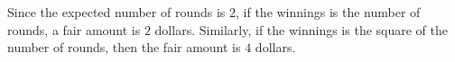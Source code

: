 Since the expected number of rounds is $2$, if the winnings is the
number of rounds, a fair amount is $2$ dollars. Similarly, if the
winnings is the square of the number of rounds, then the fair amount is
$4$ dollars.